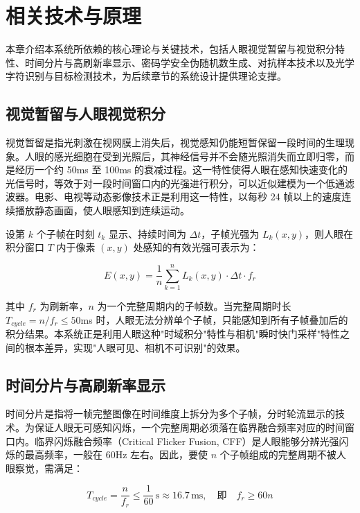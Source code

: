 \chapter{相关技术与原理}

本章介绍本系统所依赖的核心理论与关键技术，包括人眼视觉暂留与视觉积分特性、时间分片与高刷新率显示、密码学安全伪随机数生成、对抗样本技术以及光学字符识别与目标检测技术，为后续章节的系统设计提供理论支撑。

\section{视觉暂留与人眼视觉积分}

视觉暂留是指光刺激在视网膜上消失后，视觉感知仍能短暂保留一段时间的生理现象。人眼的感光细胞在受到光照后，其神经信号并不会随光照消失而立即归零，而是经历一个约 50ms 至 100ms 的衰减过程。这一特性使得人眼在感知快速变化的光信号时，等效于对一段时间窗口内的光强进行积分，可以近似建模为一个低通滤波器。电影、电视等动态影像技术正是利用这一特性，以每秒 24 帧以上的速度连续播放静态画面，使人眼感知到连续运动。

设第 $k$ 个子帧在时刻 $t_k$ 显示、持续时间为 $\Delta t$，子帧光强为 $L_k(x,y)$，则人眼在积分窗口 $T$ 内于像素 $(x,y)$ 处感知的有效光强可表示为：

\begin{equation}
E(x,y) = \frac{1}{n}\sum_{k=1}^{n} L_k(x,y) \cdot \Delta t \cdot f_r
\end{equation}

其中 $f_r$ 为刷新率，$n$ 为一个完整周期内的子帧数。当完整周期时长 $T_{cycle}=n/f_r \le 50$ms 时，人眼无法分辨单个子帧，只能感知到所有子帧叠加后的积分结果。本系统正是利用人眼这种"时域积分"特性与相机"瞬时快门采样"特性之间的根本差异，实现"人眼可见、相机不可识别"的效果。

\section{时间分片与高刷新率显示}

时间分片是指将一帧完整图像在时间维度上拆分为多个子帧，分时轮流显示的技术。为保证人眼无可感知闪烁，一个完整周期必须落在临界融合频率对应的时间窗口内。临界闪烁融合频率（Critical Flicker Fusion, CFF）是人眼能够分辨光强闪烁的最高频率，一般在 60Hz 左右。因此，要使 $n$ 个子帧组成的完整周期不被人眼察觉，需满足：

\begin{equation}
T_{cycle} = \frac{n}{f_r} \le \frac{1}{60}\,\text{s} \approx 16.7\,\text{ms},\quad\text{即}\quad f_r \ge 60n
\end{equation}

